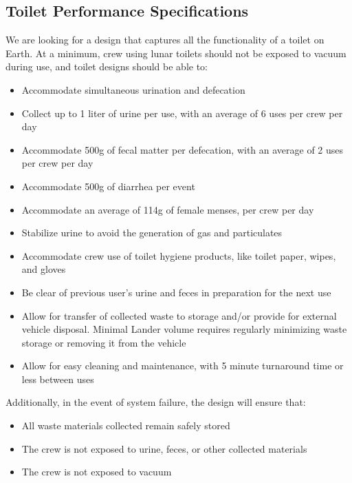     \pagebreak
    \subsection{Toilet Performance Specifications}

    We are looking for a design that captures all the functionality of a toilet on Earth.  At a minimum, crew using lunar toilets should not be exposed to vacuum during use, and toilet designs should be able to:

    \begin{itemize}
        \item Accommodate simultaneous urination and defecation
        \item Collect up to 1 liter of urine per use, with an average of 6 uses per crew per day
        \item Accommodate 500g of fecal matter per defecation, with an average of 2 uses per crew per day
        \item Accommodate 500g of diarrhea per event
        \item Accommodate an average of 114g of female menses, per crew per day
        \item Stabilize urine to avoid the generation of gas and particulates
        \item Accommodate crew use of toilet hygiene products, like toilet paper, wipes, and gloves
        \item Be clear of previous user’s urine and feces in preparation for the next use
        \item Allow for transfer of collected waste to storage  and/or provide for external vehicle disposal. Minimal Lander volume requires regularly minimizing waste storage or removing it from the vehicle
        \item Allow for easy cleaning and maintenance, with 5 minute turnaround time or less between uses
    \end{itemize}

    Additionally, in the event of system failure, the design will ensure that:

    \begin{itemize}
        \item All waste materials collected remain safely stored
        \item The crew is not exposed to urine, feces, or other collected materials
        \item The crew is not exposed to vacuum
    \end{itemize}



